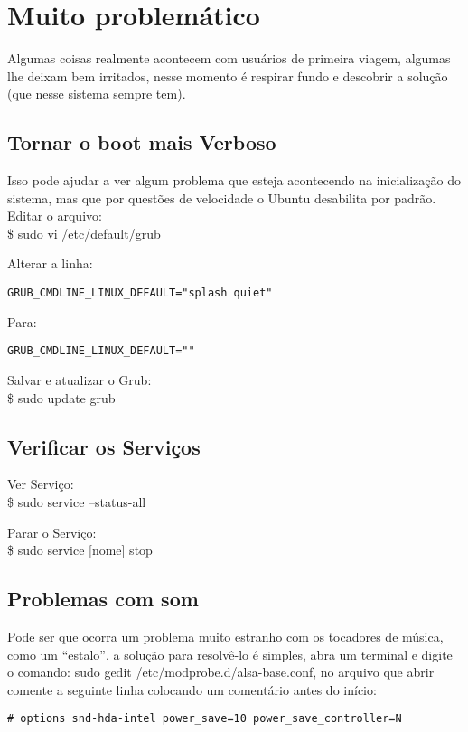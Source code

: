 \section{Muito problemático}
Algumas coisas realmente acontecem com usuários de primeira viagem, algumas lhe deixam bem irritados, nesse momento é respirar fundo e descobrir a solução (que nesse sistema sempre tem).

\subsection{Tornar o boot mais Verboso}
Isso pode ajudar a ver algum problema que esteja acontecendo na inicialização do sistema, mas que por questões de velocidade o Ubuntu desabilita por padrão. Editar o arquivo: \\
{\ttfamily\$ sudo vi /etc/default/grub}

Alterar a linha:
\begin{lstlisting}
GRUB_CMDLINE_LINUX_DEFAULT="splash quiet"
\end{lstlisting}

Para:
\begin{lstlisting}
GRUB_CMDLINE_LINUX_DEFAULT=""
\end{lstlisting}

Salvar e atualizar o Grub: \\
{\ttfamily\$ sudo update grub}

\subsection{Verificar os Serviços}
Ver Serviço: \\
{\ttfamily\$ sudo service --status-all}

Parar o Serviço: \\
{\ttfamily\$ sudo service [nome] stop}


\subsection{Problemas com som}
Pode ser que ocorra um problema muito estranho com os tocadores de música, como um “estalo”, a solução para resolvê-lo é simples, abra um terminal e digite o comando: sudo gedit /etc/modprobe.d/alsa-base.conf, no arquivo que abrir comente a seguinte linha colocando um comentário antes do início:
\begin{lstlisting}
# options snd-hda-intel power_save=10 power_save_controller=N
\end{lstlisting}

